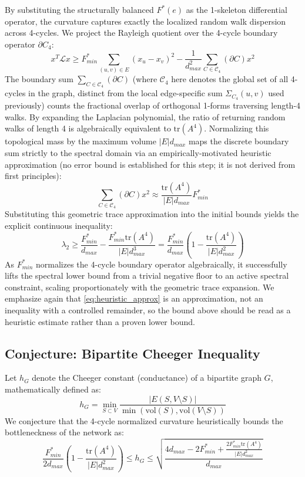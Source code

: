 \documentclass{siuro250211}
\theoremstyle{remark}
\theoremstyle{plain}
\begin{document}
By substituting the structurally balanced $F^*(e)$ as the 1-skeleton differential operator, the curvature captures exactly the localized random walk dispersion across 4-cycles. We project the Rayleigh quotient over the 4-cycle boundary operator $\partial C_4$:
\begin{equation}
x^T \mathcal{L} x \ge F_{min}^* \sum_{(u,v) \in E} (x_u - x_v)^2 - \frac{1}{d_{max}^2} \sum_{C \in \mathcal{C}_4} (\partial C) x^2
\end{equation}
The boundary sum $\sum_{C \in \mathcal{C}_4} (\partial C)$ (where $\mathcal{C}_4$ here denotes the global set of all 4-cycles in the graph, distinct from the local edge-specific sum $\Sigma_{C_4}(u,v)$ used previously) counts the fractional overlap of orthogonal 1-forms traversing length-4 walks. By expanding the Laplacian polynomial, the ratio of returning random walks of length 4 is algebraically equivalent to $\text{tr}(A^4)$. Normalizing this topological mass by the maximum volume $|E|d_{max}$ maps the discrete boundary sum strictly to the spectral domain via an empirically-motivated heuristic approximation (no error bound is established for this step; it is not derived from first principles):
\begin{equation}
\label{eq:heuristic_approx}
\sum_{C \in \mathcal{C}_4} (\partial C) x^2 \approx \frac{\text{tr}(A^4)}{|E| d_{max}} F_{min}^*
\end{equation}
Substituting this geometric trace approximation into the initial bounds yields the explicit continuous inequality:
\begin{equation}
\lambda_2 \ge \frac{F_{min}^*}{d_{max}} - \frac{F_{min}^* \text{tr}(A^4)}{|E| d_{max}^3} = \frac{F_{min}^*}{d_{max}} \left( 1 - \frac{\text{tr}(A^4)}{|E| d_{max}^2} \right)
\end{equation}
As $F_{min}^*$ normalizes the 4-cycle boundary operator algebraically, it successfully lifts the spectral lower bound from a trivial negative floor to an active spectral constraint, scaling proportionately with the geometric trace expansion. We emphasize again that \cref{eq:heuristic_approx} is an approximation, not an inequality with a controlled remainder, so the bound above should be read as a heuristic estimate rather than a proven lower bound.

\subsection{Conjecture: Bipartite Cheeger Inequality}
\label{thm:cheeger}
Let $h_G$ denote the Cheeger constant (conductance) of a bipartite graph $G$, mathematically defined as:
\begin{equation*}
h_G = \min_{S \subset V} \frac{|E(S, V \setminus S)|}{\min(\text{vol}(S), \text{vol}(V \setminus S))}
\end{equation*}
We conjecture that the 4-cycle normalized curvature heuristically bounds the bottleneckness of the network as:
\begin{equation}
\frac{F_{min}^*}{2 d_{max}} \left( 1 - \frac{\text{tr}(A^4)}{|E| d_{max}^2} \right) \le h_G \le \sqrt{\frac{4 d_{max} - 2F_{min}^* + \frac{2 F_{min}^* \text{tr}(A^4)}{|E| d_{max}^2}}{d_{max}}}
\end{equation}
\end{document}

